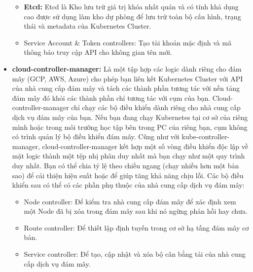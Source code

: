 \documentclass[12pt,a4paper]{report}
\begin{document}
\begin{itemize}
\begin{itemize}
		
		\item \textbf{Etcd:}
		\subitem
		Etcd là Kho lưu trữ giá trị khóa nhất quán và có tính khả dụng cao được sử dụng làm kho dự phòng để lưu trữ toàn bộ cấu hình, trạng thái và metadata của Kubernetes Cluster.
		
		\hspace{0.8cm}{Trong các cluster nhỏ, Etcd có thể chạy trên cùng một Node với các thành phần khác. Nhưng trong các cluster lớn, Etcd có thể chạy dự phòng trên nhiều Node để đảm bảo tính khả dụng của toàn hệ thống. Nếu cụm Kubernetes của bạn sử dụng Etcd làm nơi lưu trữ sao lưu, hãy đảm bảo rằng bạn có kế hoạch sao lưu cho những dữ liệu đó.}
		

		\item Service Account \& Token controllers: Tạo tài khoản mặc định và mã thông báo truy cập API cho không gian tên mới.
	\end{itemize}

	\item \textbf{cloud-controller-manager:}
	\smallskip
	\subitem
	Là một tập hợp các logic dành riêng cho đám mây (GCP, AWS, Azure) cho phép bạn liên kết Kubernetes Cluster với API của nhà cung cấp đám mây và tách các thành phần tương tác với nền tảng đám mây đó khỏi các thành phần chỉ tương tác với cụm của bạn. Cloud-controller-manager chỉ chạy các bộ điều khiển dành riêng cho nhà cung cấp dịch vụ đám mây của bạn. Nếu bạn đang chạy Kubernetes tại cơ sở của riêng mình hoặc trong môi trường học tập bên trong PC của riêng bạn, cụm không có trình quản lý bộ điều khiển đám mây.
	\smallskip
	\subitem Cũng như với kube-controller-manager, cloud-controller-manager kết hợp một số vòng điều khiển độc lập về mặt logic thành một tệp nhị phân duy nhất mà bạn chạy như một quy trình duy nhất. Bạn có thể chia tỷ lệ theo chiều ngang (chạy nhiều hơn một bản sao) để cải thiện hiệu suất hoặc để giúp tăng khả năng chịu lỗi.
	\smallskip
	\subitem Các bộ điều khiển sau có thể có các phần phụ thuộc của nhà cung cấp dịch vụ đám mây:
	\begin{itemize}
	\item Node controller: Để kiểm tra nhà cung cấp đám mây để xác định xem một Node đã bị xóa trong đám mây sau khi nó ngừng phản hồi hay chưa.
	
	\item Route controller: Để thiết lập định tuyến trong cơ sở hạ tầng đám mây cơ bản.
	
	\item Service controller: Để tạo, cập nhật và xóa bộ cân bằng tải của nhà cung cấp dịch vụ đám mây.
	\end{itemize}
	

\end{itemize}
\end{document}
